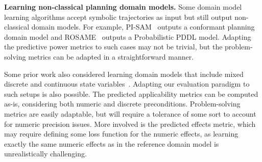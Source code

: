 \documentclass{article}
\newcommand{\miniparagraph}[1]{\textbf{#1.}}
\theoremstyle{definition}
\theoremstyle{remark}
\newif\ifaddcomments
\newcommand{\todo}[1]{\ifaddcomments{\textcolor{red}{[TODO: #1]}}\fi}
\newcommand{\roni}[1]{\ifaddcomments{\textcolor{red}{[Roni: #1]}}\fi}
\newcommand{\argaman}[1]{\ifaddcomments{\textcolor{blue}{[Argaman: #1]}}\fi}
\newcommand{\yarin}[1]{\ifaddcomments{\textcolor{teal}{[Yarin: #1]}}\fi}
\begin{document}
\miniparagraph{Learning non-classical planning domain models}
Some domain model learning algorithms accept symbolic trajectories as input but still output non-classical domain models. For example, PI-SAM~\citep{le2024learning} outputs a conformant planning domain model and ROSAME~\citep{xi2024neuro} outputs a Probabilistic PDDL model. \roni{I vaguely remember some other work that does this, maybe}
Adapting the predictive power metrics to such cases may not be trivial, but the problem-solving metrics can be adapted in a straightforward manner. 


Some prior work also considered learning domain models that include mixed discrete and continuous state variables~\citep{segura2021discovering,mordoch2023learning}. 
Adapting our evaluation paradigm to such setups is also possible. 
The predicted applicability metrics can be computed as-is, considering both numeric and discrete preconditions.
Problem-solving metrics are easily adaptable, but will require a tolerance of some sort to account for numeric precision issues. 
More involved is the predicted effects metric, which may require defining some loss function for the numeric effects, as learning exactly the same numeric effects as in the reference domain model is unrealistically challenging. 















\end{document}
